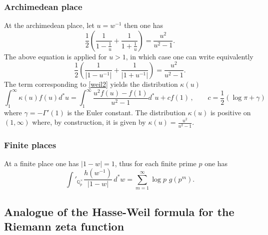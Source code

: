 \documentclass[noams,lp]{compositio}
\def\Q{{\mathbb Q}}
\begin{document}
\subsubsection*{Archimedean place}
At the archimedean place, let $u=w^{-1}$ then one has 
$$
\frac 12\left( \frac{1}{1-\frac 1u}+\frac{1}{1+\frac 1u}\right)=\frac{u^2}{u^2-1}.
$$
The above equation is applied for $u>1$, in which case one can write equivalently
\begin{equation}\label{weil1}
\frac 12\left( \frac{1}{\vert 1-u^{-1}\vert}+\frac{1}{\vert 1+u^{-1}\vert}\right)=\frac{u^2}{u^2-1}.
\end{equation}
The term corresponding to \eqref{weil2} yields the distribution $\kappa(u)$
\begin{equation}\label{kappadu}
\int_1^\infty\kappa(u)f(u)d^*u=\int_1^\infty\frac{u^2f(u)-f(1)}{u^2-1}d^*u+cf(1)\,, \qquad c=\frac12(\log\pi+\gamma)
\end{equation}
where $\gamma=-\Gamma'(1)$ is the Euler constant. The distribution $\kappa(u)$ is positive on $(1,\infty)$ where, by construction, it is given by $\kappa(u)=\frac{u^2}{u^2-1}$.
\vspace{.02in}

\subsubsection*{Finite places}

At a finite place one has
 $\vert 1-w   \vert=1$, thus for each finite prime $p$ one has
\begin{equation}\label{weil3}
\int'_{\Q_p^\times} \frac{h(w^{-1}) }{   \vert 1-w   \vert} \, d^* w=
\sum_{m=1}^\infty \log p \,\,g(p^m).
\end{equation}




 \subsection{Analogue of the Hasse-Weil formula for the  Riemann zeta function}\label{hasseweilsect}
\end{document}
